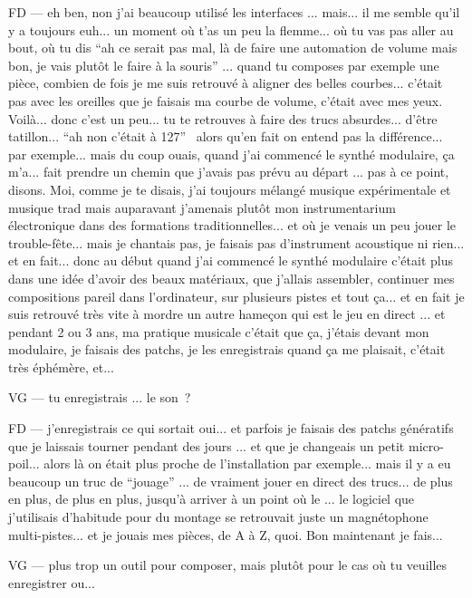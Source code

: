 FD — eh ben, non j'ai beaucoup utilisé les interfaces ... mais... il me semble qu'il y a toujours euh... un moment où t'as un peu la flemme... où tu vas pas aller au bout, où tu dis ``ah ce serait pas mal, là de faire une automation de volume mais bon, je vais plutôt le faire à la souris'' ... quand tu composes par exemple une pièce, combien de fois je me suis retrouvé à aligner des belles courbes... c'était pas avec les oreilles que je faisais ma courbe de volume, c'était avec mes yeux. Voilà... donc c'est un peu... tu te retrouves à faire des trucs absurdes... d'être tatillon... ``ah non c'était à 127''  alors qu'en fait on entend pas la différence... par exemple... mais du coup ouais, quand j'ai commencé le synthé modulaire, ça m'a... fait prendre un chemin que j'avais pas prévu au départ ... pas à ce point, disons. Moi, comme je te disais, j'ai toujours mélangé musique expérimentale et musique trad mais auparavant j'amenais plutôt mon instrumentarium électronique dans des formations traditionnelles... et où je venais un peu jouer le trouble-fête... mais je chantais pas, je faisais pas d'instrument acoustique ni rien... et en fait... donc au début quand j'ai commencé le synthé modulaire c'était plus dans une idée d'avoir des beaux matériaux, que j'allais assembler, continuer mes compositions pareil dans l'ordinateur, sur plusieurs pistes et tout ça... et en fait je suis retrouvé très vite à mordre un autre hameçon qui est le jeu en direct ... et pendant 2 ou 3 ans, ma pratique musicale c'était que ça, j'étais devant mon modulaire, je faisais des patchs, je les enregistrais quand ça me plaisait, c'était très éphémère, et... 

VG — tu enregistrais ... le son ? 

FD — j'enregistrais ce qui sortait oui... et parfois je faisais des patchs génératifs que je laissais tourner pendant des jours ... et que je changeais un petit micro-poil... alors là on était plus proche de l'installation par exemple... mais il y a eu beaucoup un truc de ``jouage'' ... de vraiment jouer en direct des trucs... de plus en plus, de plus en plus, jusqu'à arriver à un point où le ... le logiciel que j'utilisais d'habitude pour du montage se retrouvait juste un magnétophone multi-pistes... et je jouais mes pièces, de A à Z, quoi. Bon maintenant je fais... 

VG — plus trop un outil pour composer, mais plutôt pour le cas où tu veuilles enregistrer ou... 

